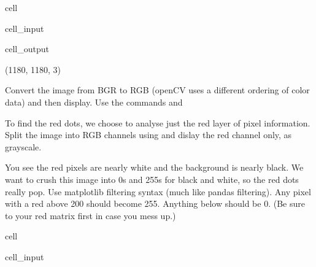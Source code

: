 \documentclass[letterpaper,10pt,english]{jupyterBook}
\begin{document}
\begin{sphinxuseclass}{cell}\begin{sphinxVerbatimInput}

\begin{sphinxuseclass}{cell_input}
\begin{sphinxVerbatim}[commandchars=\\\{\}]
  \PYG{p}{[}\PYG{p}{]}
\end{sphinxVerbatim}

\end{sphinxuseclass}\end{sphinxVerbatimInput}
\begin{sphinxVerbatimOutput}

\begin{sphinxuseclass}{cell_output}
\begin{sphinxVerbatim}[commandchars=\\\{\}]
(1180, 1180, 3)
\end{sphinxVerbatim}

\end{sphinxuseclass}\end{sphinxVerbatimOutput}

\end{sphinxuseclass}
\sphinxAtStartPar
Convert the image from BGR to RGB (openCV uses a different ordering of color data) and then display. Use the commands  and 

\sphinxAtStartPar
To find the red dots, we choose to analyse just the red layer of pixel information. Split the image into RGB channels using  and dislay the red channel only, as grayscale.

\sphinxAtStartPar
You see the red pixels are nearly white and the background is nearly black. We want to crush this image into 0s and 255s for black and white, so the red dots really pop. Use matplotlib filtering syntax (much like pandas filtering). Any pixel with a red above 200 should become 255. Anything below should be 0. (Be sure to  your red matrix first in case you mess up.)

\begin{sphinxuseclass}{cell}\begin{sphinxVerbatimInput}

\begin{sphinxuseclass}{cell_input}
\begin{sphinxVerbatim}[commandchars=\\\{\}]
\end{sphinxVerbatim}

\end{sphinxuseclass}\end{sphinxVerbatimInput}

\end{sphinxuseclass}
\sphinxAtStartPar
{}
\end{document}
